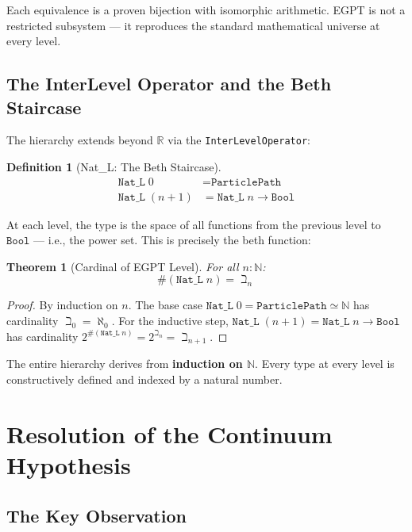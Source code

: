\documentclass{report}
\newtheorem{theorem}{Theorem}
\newtheorem{definition}{Definition}
\begin{document}
Each equivalence is a proven bijection with isomorphic arithmetic. EGPT is not a
restricted subsystem --- it reproduces the standard mathematical universe at
every level.

\subsection{The InterLevel Operator and the Beth Staircase}

The hierarchy extends beyond $\mathbb{R}$ via the \texttt{InterLevelOperator}:

\begin{definition}[Nat\_L: The Beth Staircase]
\begin{align*}
\texttt{Nat\_L}\; 0 &= \texttt{ParticlePath} \\
\texttt{Nat\_L}\; (n+1) &= \texttt{Nat\_L}\; n \to \texttt{Bool}
\end{align*}
\end{definition}

At each level, the type is the space of all functions from the previous level
to $\texttt{Bool}$ --- i.e., the power set. This is precisely the beth function:

\begin{theorem}[Cardinal of EGPT Level]
For all $n : \mathbb{N}$:
$$\#(\texttt{Nat\_L}\; n) = \beth_n$$
\end{theorem}

\begin{proof}
By induction on $n$. The base case $\texttt{Nat\_L}\; 0 = \texttt{ParticlePath}
\simeq \mathbb{N}$ has cardinality $\beth_0 = \aleph_0$. For the inductive step,
$\texttt{Nat\_L}\; (n+1) = \texttt{Nat\_L}\; n \to \texttt{Bool}$ has cardinality
$2^{\#(\texttt{Nat\_L}\; n)} = 2^{\beth_n} = \beth_{n+1}$.
\end{proof}

The entire hierarchy derives from \textbf{induction on $\mathbb{N}$}. Every type
at every level is constructively defined and indexed by a natural number.

\section{Resolution of the Continuum Hypothesis}

\subsection{The Key Observation}
\end{document}
